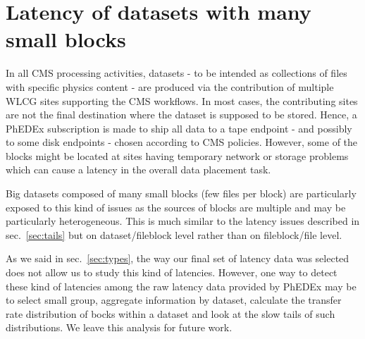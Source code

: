 \section{Latency of datasets with many small blocks}
\label{sec:smallblocks}

In all CMS processing activities, datasets - to be intended as
collections of files with specific physics content - are produced via
the contribution of multiple WLCG sites supporting the CMS
workflows. In most cases, the contributing sites are not the final
destination where the dataset is supposed to be stored. Hence, a
PhEDEx subscription is made to ship all data to a tape endpoint - and
possibly to some disk endpoints - chosen according to CMS
policies. However, some of the blocks might be located at sites having
temporary network or storage problems which can cause a latency in
the overall data placement task.

Big datasets composed of many small blocks (few files per block) are
particularly exposed to this kind of issues as the sources of blocks
are multiple and may be particularly heterogeneous. This is much
similar to the latency issues described in sec.~\ref{sec:tails} but on
dataset/fileblock level rather than on fileblock/file level.

As we said in sec.~\ref{sec:types}, the way our final set of latency
data was selected does not allow us to study this kind of
latencies. However, one way to detect these kind of latencies among
the raw latency data provided by PhEDEx may be to select small group,
aggregate information by dataset, calculate the transfer rate
distribution of bocks within a dataset and look at the slow tails of
such distributions. We leave this analysis for future work.

